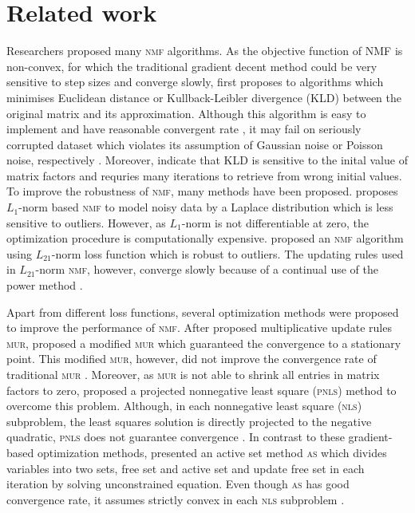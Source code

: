 \section{Related work}
Researchers proposed many \textsc{nmf} algorithms. As the objective function of \textsc{NMF} is non-convex, for which the traditional gradient decent method could be very sensitive to step sizes and converge slowly, \citet{lee2001algorithms} first proposes to algorithms which minimises Euclidean distance or Kullback-Leibler divergence (\textsc{KLD}) between the original matrix and its approximation. Although this algorithm is easy to implement and have reasonable convergent rate \citep{lee2001algorithms}, it may fail on seriously corrupted dataset which violates its assumption of Gaussian noise or Poisson noise, respectively \citep{guan2017truncated}. Moreover, \citet{yang2011kullback} indicate that \textsc{KLD} is sensitive to the inital value of matrix factors and requries many iterations to retrieve from wrong initial values.  To improve the robustness of \textsc{nmf}, many methods have been proposed. \citet{lam2008non} proposes ${L_1}$-norm based \textsc{nmf} to model noisy data by a Laplace distribution which is less sensitive to outliers. However, as $L_1$-norm is not differentiable at zero, the optimization procedure is computationally expensive. \citet{kong2011robust} proposed an \textsc{nmf} algorithm using $L_{21}$-norm loss function which is robust to outliers. The updating rules used in $L_{21}$-norm \textsc{nmf}, however, converge slowly because of a continual use of the power method \citep{guan2017truncated}.

Apart from different loss functions, several optimization methods were proposed to improve the performance of \textsc{nmf}. After \citet{lee2001algorithms} proposed  multiplicative update rules \textsc{mur}, \citet{ lin2007convergence} proposed a modified \textsc{mur} which guaranteed the convergence to a stationary point. This modified \textsc{mur}, however, did not improve the convergence rate of traditional \textsc{mur} \citep{guan2012nenmf}. Moreover, as \textsc{mur} is not able to shrink all entries in matrix factors to zero, \citet{berry2007algorithms} proposed a projected nonnegative least square (\textsc{pnls}) method to overcome this problem. Although, in each nonnegative least square (\textsc{nls}) subproblem, the least squares solution is directly projected to the negative quadratic, \textsc{pnls} does not guarantee convergence \citep{guan2012nenmf}. In contrast to these gradient-based optimization methods, \citet{kim2008nonnegative} presented an active set method \textsc{as} which divides variables into two sets, free set and active set and update free set in each iteration by solving unconstrained equation. Even though \textsc{as} has good convergence rate, it assumes strictly convex in each \textsc{nls} subproblem \citep{kim2008nonnegative}.
